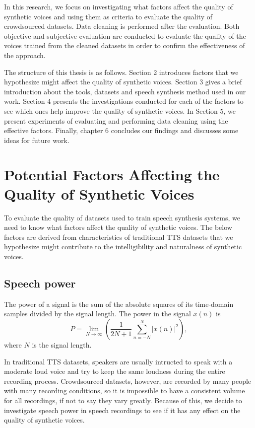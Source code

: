 \documentclass[12pt]{article}
\begin{document}
In this research, we focus on investigating what factors affect the quality of synthetic voices and using them as criteria to evaluate the quality of crowdsourced datasets. Data cleaning is performed after the evaluation. Both objective and subjective evaluation are conducted to evaluate the quality of the voices trained from the cleaned datasets in order to confirm the effectiveness of the approach.

The structure of this thesis is as follows. Section 2 introduces factors that we hypothesize might affect the quality of synthetic voices. Section 3 gives a brief introduction about the tools, datasets and speech synthesis method used in our work. Section 4 presents the investigations conducted for each of the factors to see which ones help improve the quality of synthetic voices. In Section 5, we present experiments of evaluating and performing data cleaning using the effective factors. Finally, chapter 6 concludes our findings and discusses some ideas for future work.
 

\clearpage
\section{Potential Factors Affecting the Quality of Synthetic Voices}\label{sec_potentialFactors}
To evaluate the quality of datasets used to train speech synthesis systems, we need to know what factors affect the quality of synthetic voices. The below factors are derived from characteristics of traditional TTS datasets that we hypothesize might contribute to the intelligibility and naturalness of synthetic voices.

\subsection{Speech power}\label{subsec_speechPower}
The power of a signal is the sum of the absolute squares of its time-domain samples divided by the signal length. The power in the signal $x(n)$ is
\begin{equation}\label{exp_power}
    P = \lim_{N\to\infty} (\frac{1}{2N+1}\sum_{n=-N}^{N} |x(n)|^2),
\end{equation}
where $N$ is the signal length.

In traditional TTS datasets, speakers are usually intructed to speak with a moderate loud voice and try to keep the same loudness during the entire recording process. Crowdsourced datasets, however, are recorded by many people with many recording conditions, so it is impossible to have a consistent volume for all recordings, if not to say they vary greatly. Because of this, we decide to investigate speech power in speech recordings to see if it has any effect on the quality of synthetic voices.
\end{document}
